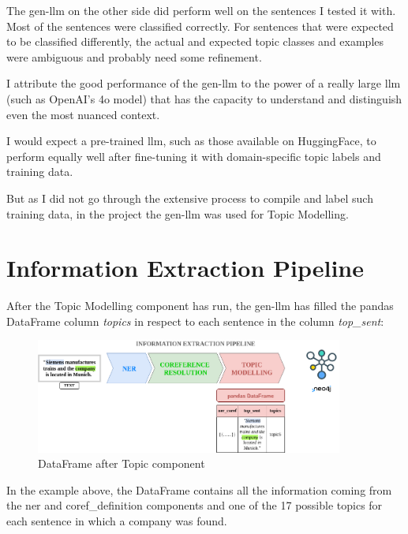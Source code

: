 The \gls{gen-llm} on the other side did perform well on the sentences I tested it with.
Most of the sentences were classified correctly.
For sentences that were expected to be classified differently, the actual and expected topic classes and examples were ambiguous and probably need some refinement.

I attribute the good performance of the \gls{gen-llm} to the power of a really large \gls{llm} (such as OpenAI's 4o model) that has the capacity to understand and distinguish even the most nuanced context.

I would expect a pre-trained \gls{llm}, such as those available on HuggingFace, to perform equally well after fine-tuning it with domain-specific topic labels and training data.

But as I did not go through the extensive process to compile and label such training data, in the project the \gls{gen-llm} was used for Topic Modelling.

\section{Information Extraction Pipeline}
After the Topic Modelling component has run, the \gls{gen-llm} has filled the pandas DataFrame column \emph{topics} in respect to each sentence in the column \emph{top\_sent}:
\begin{figure}[H]   %
    \centering
    \includegraphics[width=0.90\textwidth]{Assets/pipelineTopic}
    \caption{DataFrame after Topic component}
    \label{fig:pipeTopic}
\end{figure}
In the example above, the DataFrame contains all the information coming from the \gls{ner} and \gls{coref_definition} components and one of the 17 possible topics for each sentence in which a company was found.


